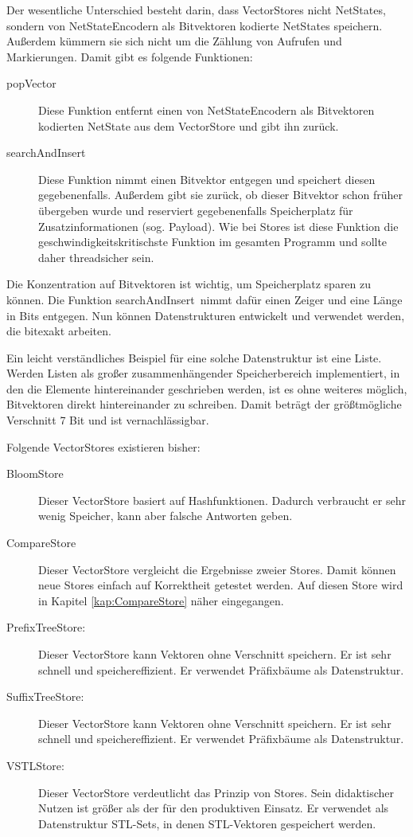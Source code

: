 \documentclass[12pt,a4paper,titlepage]{scrartcl}
\renewcommand \( {\left (}
\renewcommand \) {\right )}
\renewcommand \[ {\left [}
\renewcommand \] {\right ]}
\newcommand \Flqq {\flqq\ }
\begin{document}
Der wesentliche Unterschied besteht darin, dass VectorStores nicht NetStates, sondern von NetStateEncodern als Bitvektoren kodierte NetStates speichern. Außerdem kümmern sie sich nicht um die Zählung von Aufrufen und Markierungen. Damit gibt es folgende Funktionen:
\begin{description}
\item[popVector] Diese Funktion entfernt einen von NetStateEncodern als Bitvektoren kodierten NetState aus dem VectorStore und gibt ihn zurück. 
\item[searchAndInsert] Diese Funktion nimmt einen Bitvektor entgegen und speichert diesen gegebenenfalls. Außerdem gibt sie zurück, ob dieser Bitvektor schon früher übergeben wurde und reserviert gegebenenfalls Speicherplatz für Zusatzinformationen (sog. Payload). Wie bei Stores ist diese Funktion die geschwindigkeitskritischste Funktion im gesamten Programm und sollte daher threadsicher sein.
\end{description}
Die Konzentration auf Bitvektoren ist wichtig, um Speicherplatz sparen zu können. Die Funktion \frqq searchAndInsert\Flqq nimmt dafür einen Zeiger und eine Länge in Bits entgegen. Nun können Datenstrukturen entwickelt und verwendet werden, die bitexakt arbeiten.

Ein leicht verständliches Beispiel für eine solche Datenstruktur ist eine Liste. Werden Listen als großer zu\-sammen\-hängen\-der Speicherbereich implementiert, in den die Elemente hintereinander geschrieben werden, ist es ohne weiteres möglich, Bitvektoren direkt hintereinander zu schreiben. Damit beträgt der größtmögliche Verschnitt 7 Bit und ist vernachlässigbar.

Folgende VectorStores existieren bisher:
\begin{description}
\item[BloomStore] Dieser VectorStore basiert auf Hashfunktionen. Dadurch verbraucht er sehr wenig Speicher, kann aber falsche Antworten geben.
\item[CompareStore] Dieser VectorStore vergleicht die Ergebnisse zweier Stores. Damit können neue Stores einfach auf Korrektheit getestet werden. Auf diesen Store wird in Kapitel \ref{kap:CompareStore} näher eingegangen.
\item[PrefixTreeStore:] Dieser VectorStore kann Vektoren ohne Verschnitt speichern. Er ist sehr schnell und speichereffizient. Er verwendet Präfixbäume als Datenstruktur.
\item[SuffixTreeStore:] Dieser VectorStore kann Vektoren ohne Verschnitt speichern. Er ist sehr schnell und speichereffizient. Er verwendet Präfixbäume als Datenstruktur.
\item[VSTLStore:] Dieser VectorStore verdeutlicht das Prinzip von Stores. Sein didaktischer Nutzen ist größer als der für den produktiven Einsatz. Er verwendet als Datenstruktur STL-Sets, in denen STL-Vektoren gespeichert werden.
\end{description}
\end{document}

